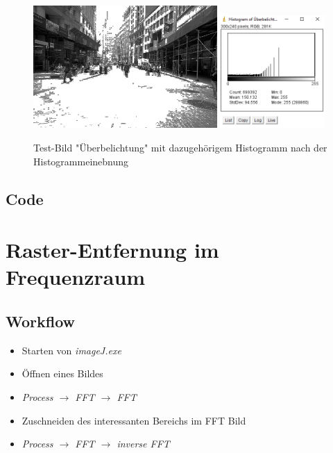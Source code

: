 \documentclass[12pt,german]{article}
\begin{document}
\begin{figure}[H] \centering
	\includegraphics[width=7cm]{../testData/Results/Ueberbelichtung/Ueberbelichtung-equalized.jpg}
	\includegraphics[width=4cm]{../testData/Results/Ueberbelichtung/Ueberbelichtung-equalized-histogram.png}
	\caption{Test-Bild "Überbelichtung" mit dazugehörigem Histogramm nach der Histogrammeinebnung}
	\label{fig:Ueberbelichtung02}
\end{figure}
\pagebreak
\subsection{Code}




\newpage
\section{ Raster-Entfernung im Frequenzraum}
\subsection{Workflow}
\begin{itemize}
	\item Starten von \textit{imageJ.exe}
	\item Öffnen eines Bildes
	\item \textit{Process $\rightarrow$ FFT $\rightarrow$ FFT}
	\item Zuschneiden des interessanten Bereichs im FFT Bild
	\item \textit{Process $\rightarrow$ FFT $\rightarrow$ inverse FFT}
\end{itemize}
\end{document}
